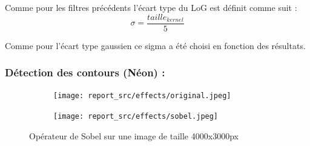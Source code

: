         Comme pour les filtres précédents l'écart type du LoG est définit comme suit :
        \[            
            \sigma =  \frac{taille_{kernel}}{5}
        \]

        Comme pour l'écart type gaussien ce sigma a été choisi en fonction des résultats.
        \newpage

    \subsubsection{Détection des contours (Néon) : } \label{neon}

        \begin{figure}[!h]
            \centering
            \begin{subfigure}[b]{0.4\textwidth}
                \texttt{[image: report\_src/effects/original.jpeg]}
            \end{subfigure}
            \begin{subfigure}[b]{0.4\textwidth}
                \texttt{[image: report\_src/effects/sobel.jpeg]}
            \end{subfigure}
            \caption*{Opérateur de Sobel sur une image de taille 4000x3000px}
        \end{figure} 
        
